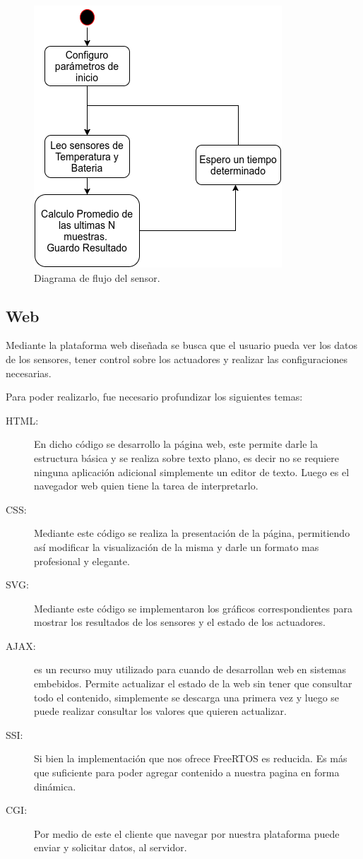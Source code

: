 \begin{figure}[!htb]
  \centering
  \includegraphics[scale=.5]{./Figures/sensor_task.png}
  \caption{Diagrama de flujo del sensor.}
  \label{fig:sensor_task}
\end{figure}

\subsection{Web}
Mediante la plataforma web diseñada se busca que el usuario pueda ver los datos de los sensores, tener control sobre los actuadores y realizar las configuraciones necesarias. 

Para poder realizarlo, fue necesario profundizar los siguientes temas:
\begin{description}
    \item[HTML:] En dicho código se desarrollo la página web, este permite darle la estructura básica y se realiza sobre texto plano, es decir no se requiere ninguna aplicación adicional simplemente un editor de texto. Luego es el navegador web quien tiene la tarea de interpretarlo. 
    \item[CSS:] Mediante este código se realiza la presentación de la página, permitiendo así modificar la visualización de la misma y darle un formato mas profesional y elegante.
    \item[SVG:] Mediante este código se implementaron los gráficos correspondientes para mostrar los resultados de los sensores y el estado de los actuadores.
    \item[AJAX:] es un recurso muy utilizado para cuando de desarrollan web en sistemas embebidos. Permite actualizar el estado de la web sin tener que consultar todo el contenido, simplemente se descarga una primera vez y luego se puede realizar consultar los valores que quieren actualizar. 
    \item[SSI:] Si bien la implementación que nos ofrece FreeRTOS es reducida. Es más que suficiente para poder agregar contenido a nuestra pagina en forma dinámica.
    \item[CGI:] Por medio de este el cliente que navegar por nuestra plataforma puede enviar y solicitar datos, al servidor.
\end{description}

